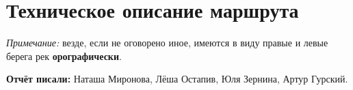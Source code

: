 \section{Техническое описание маршрута}
\textit{Примечание:} везде, если не оговорено иное, имеются в виду правые и левые берега рек \textbf{орографически}.

\textbf{Отчёт писали:} Наташа Миронова, Лёша Остапив, Юля Зернина, Артур Гурский.






